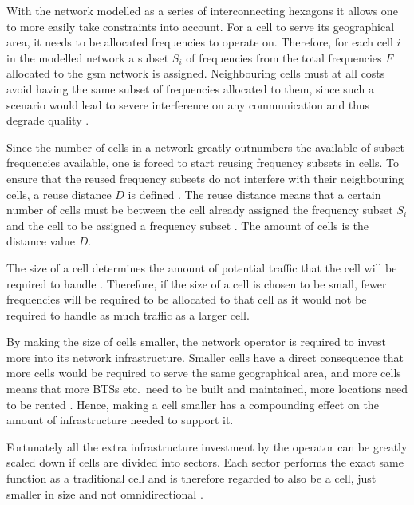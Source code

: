 With the network modelled as a series of interconnecting hexagons it allows one to more easily take constraints into account\cite{Eisenblatter}. For a cell to serve its geographical area, it needs to be allocated frequencies to operate on. Therefore, for each cell $i$ in the modelled network a subset $S_i$ of frequencies from the total frequencies $F$ allocated to the \gls{gsm} network is assigned\cite{GSMArchitectureProtocolsServices}. Neighbouring cells must at all costs avoid having the same subset of frequencies allocated to them, since such a scenario would lead to severe interference on any communication and thus degrade quality \cite{GSMArchitectureProtocolsServices}.

Since the number of cells in a network greatly outnumbers the available of subset frequencies available, one is forced to start reusing frequency subsets in cells\cite{GSMArchitectureProtocolsServices}. To ensure that the reused frequency subsets do not interfere with their neighbouring cells, a reuse distance $D$ is defined \cite{GSMArchitectureProtocolsServices}. The reuse distance means that a certain number of cells must be between the cell already assigned the frequency subset $S_i$ and the cell to be assigned a frequency subset \cite{GSMArchitectureProtocolsServices}. The amount of cells is the distance value $D$.

The size of a cell determines the amount of potential traffic that the cell will be required to handle \cite{GSM92,Eisenblatter,GSMArchitectureProtocolsServices}. Therefore, if the size of a cell is chosen to be small, fewer frequencies will be required to be allocated to that cell as it would not be required to handle as much traffic as a larger cell\cite{GSMArchitectureProtocolsServices}. 

By making the size of cells smaller, the network operator is required to invest more into its network infrastructure. Smaller cells have a direct consequence that more cells would be required to serve the same geographical area, and more cells means that more \glspl{BTS} etc.\ need to be built and maintained, more locations need to be rented \cite{GSMArchitectureProtocolsServices}. Hence, making a cell smaller has a compounding effect on the amount of infrastructure needed to support it.

Fortunately all the extra infrastructure investment by the operator can be greatly scaled down if cells are divided into sectors\label{def:cellsector}. Each sector performs the exact same function as a traditional cell and is therefore regarded to also be a cell, just smaller in size and not omnidirectional \cite{GSMArchitectureProtocolsServices,GSM92,GSMSysEngin}. 

